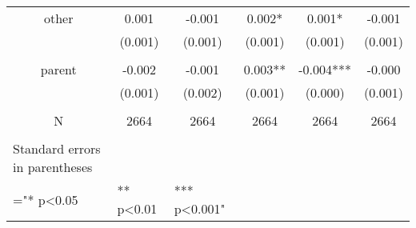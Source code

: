 \documentclass{article}
\begin{document}
\begin{table}[htbp]
\begin{tabular}{lllrrr}
      \multicolumn{1}{c}{other} & \multicolumn{1}{c}{0.001} & \multicolumn{1}{c}{-0.001} & \multicolumn{1}{c}{0.002*} & \multicolumn{1}{c}{0.001*} & \multicolumn{1}{c}{-0.001} \\
      \multicolumn{1}{c}{} & \multicolumn{1}{c}{(0.001)} & \multicolumn{1}{c}{(0.001)} & \multicolumn{1}{c}{(0.001)} & \multicolumn{1}{c}{(0.001)} & \multicolumn{1}{c}{(0.001)} \\
                 &            &            &            &            &  \\
      \multicolumn{1}{c}{parent} & \multicolumn{1}{c}{-0.002} & \multicolumn{1}{c}{-0.001} & \multicolumn{1}{c}{0.003**} & \multicolumn{1}{c}{-0.004***} & \multicolumn{1}{c}{-0.000} \\
      \multicolumn{1}{c}{} & \multicolumn{1}{c}{(0.001)} & \multicolumn{1}{c}{(0.002)} & \multicolumn{1}{c}{(0.001)} & \multicolumn{1}{c}{(0.000)} & \multicolumn{1}{c}{(0.001)} \\
                 &            &            &            &            &  \\
      \multicolumn{1}{c}{N} & \multicolumn{1}{c}{2664} & \multicolumn{1}{c}{2664} & \multicolumn{1}{c}{2664} & \multicolumn{1}{c}{2664} & \multicolumn{1}{c}{2664} \bigstrut[b]\\
      \hline
                 &            &            &            &            &  \bigstrut[t]\\
      Standard errors in parentheses &            &            &            &            &  \\
      ="* p<0.05 &  ** p<0.01 &  *** p<0.001" &            &            &  \\
      \end{tabular}%
    \label{tab:addlabel}%
  \end{table}%
\end{document}
